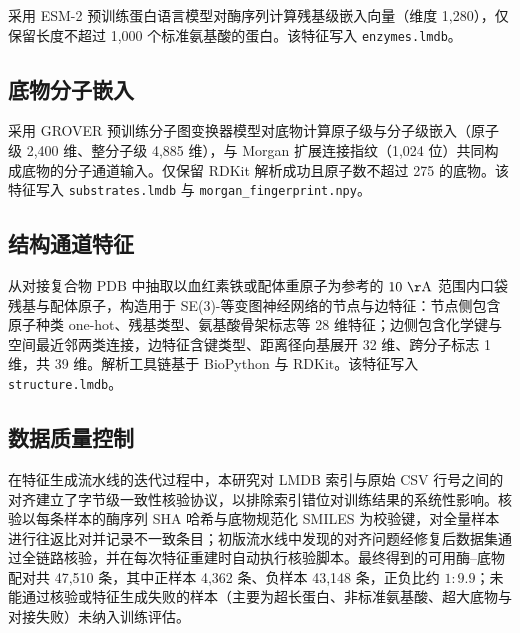 采用 ESM-2\cite{ESM2023} 预训练蛋白语言模型对酶序列计算残基级嵌入向量（维度 1{,}280），仅保留长度不超过 1{,}000 个标准氨基酸的蛋白。该特征写入 \texttt{enzymes.lmdb}。

\subsection{底物分子嵌入}
\label{subsec:feat-substrate}

采用 GROVER\cite{GROVER2020} 预训练分子图变换器模型对底物计算原子级与分子级嵌入（原子级 2{,}400 维、整分子级 4{,}885 维），与 Morgan 扩展连接指纹\cite{ECFP2010}（1{,}024 位）共同构成底物的分子通道输入。仅保留 RDKit 解析成功且原子数不超过 275 的底物。该特征写入 \texttt{substrates.lmdb} 与 \texttt{morgan\_fingerprint.npy}。

\subsection{结构通道特征}
\label{subsec:feat-structure}

从对接复合物 PDB 中抽取以血红素铁或配体重原子为参考的 $10~\mathrm{\AA}$ 范围内口袋残基与配体原子，构造用于 SE(3)-等变图神经网络的节点与边特征：节点侧包含原子种类 one-hot、残基类型、氨基酸骨架标志等 28 维特征；边侧包含化学键与空间最近邻两类连接，边特征含键类型、距离径向基展开 32 维、跨分子标志 1 维，共 39 维。解析工具链基于 BioPython\cite{Biopython2009} 与 RDKit。该特征写入 \texttt{structure.lmdb}。

\subsection{数据质量控制}
\label{subsec:feat-qc}

在特征生成流水线的迭代过程中，本研究对 LMDB 索引与原始 CSV 行号之间的对齐建立了字节级一致性核验协议，以排除索引错位对训练结果的系统性影响。核验以每条样本的酶序列 SHA 哈希与底物规范化 SMILES 为校验键，对全量样本进行往返比对并记录不一致条目；初版流水线中发现的对齐问题经修复后数据集通过全链路核验，并在每次特征重建时自动执行核验脚本。最终得到的可用酶--底物配对共 47{,}510 条，其中正样本 4{,}362 条、负样本 43{,}148 条，正负比约 $1:9.9$；未能通过核验或特征生成失败的样本（主要为超长蛋白、非标准氨基酸、超大底物与对接失败）未纳入训练评估。

